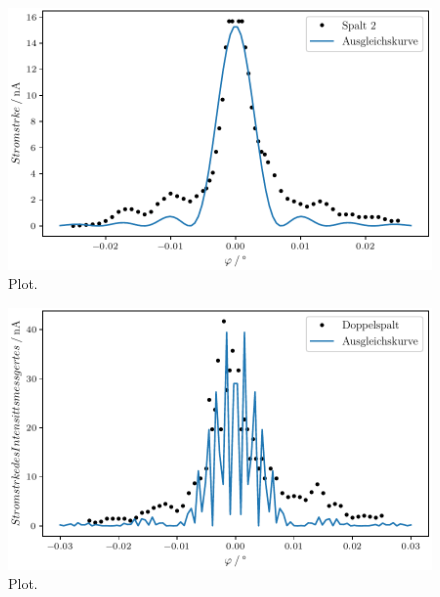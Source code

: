 \begin{figure}
  \centering
  \includegraphics{plot1.pdf}
  \caption{Plot.}
  \label{fig:plot}
\end{figure}

\begin{figure}
  \centering
  \includegraphics{plot2.pdf}
  \caption{Plot.}
  \label{fig:plot}
\end{figure}

